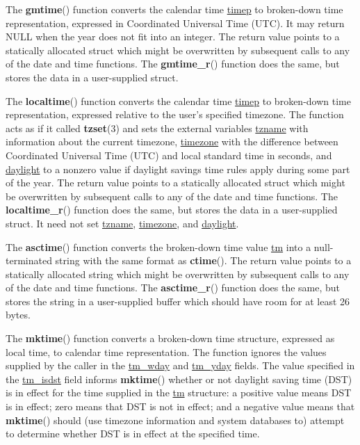 \documentclass[]{article}
\let\realtextbf=\textbf
\renewcommand{\textbf}[1]{\textcolor{boldcolor}{\realtextbf{#1}}}
\renewcommand{\emph}[1]{\underline{#1}}
\begin{document}
The \textbf{gmtime}() function converts the calendar time \emph{timep}
to broken-down time representation, expressed in Coordinated Universal
Time (UTC). It may return NULL when the year does not fit into an
integer. The return value points to a statically allocated struct which
might be overwritten by subsequent calls to any of the date and time
functions. The \textbf{gmtime\_r}() function does the same, but stores
the data in a user-supplied struct.

The \textbf{localtime}() function converts the calendar time
\emph{timep} to broken-down time representation, expressed relative to
the user's specified timezone. The function acts as if it called
\textbf{tzset}(3) and sets the external variables \emph{tzname} with
information about the current timezone, \emph{timezone} with the
difference between Coordinated Universal Time (UTC) and local standard
time in seconds, and \emph{daylight} to a nonzero value if daylight
savings time rules apply during some part of the year. The return value
points to a statically allocated struct which might be overwritten by
subsequent calls to any of the date and time functions. The
\textbf{localtime\_r}() function does the same, but stores the data in a
user-supplied struct. It need not set \emph{tzname}, \emph{timezone},
and \emph{daylight}.

The \textbf{asctime}() function converts the broken-down time value
\emph{tm} into a null-terminated string with the same format as
\textbf{ctime}(). The return value points to a statically allocated
string which might be overwritten by subsequent calls to any of the date
and time functions. The \textbf{asctime\_r}() function does the same,
but stores the string in a user-supplied buffer which should have room
for at least 26 bytes.

The \textbf{mktime}() function converts a broken-down time structure,
expressed as local time, to calendar time representation. The function
ignores the values supplied by the caller in the \emph{tm\_wday} and
\emph{tm\_yday} fields. The value specified in the \emph{tm\_isdst}
field informs \textbf{mktime}() whether or not daylight saving time
(DST) is in effect for the time supplied in the \emph{tm} structure: a
positive value means DST is in effect; zero means that DST is not in
effect; and a negative value means that \textbf{mktime}() should (use
timezone information and system databases to) attempt to determine
whether DST is in effect at the specified time.

~
\end{document}
